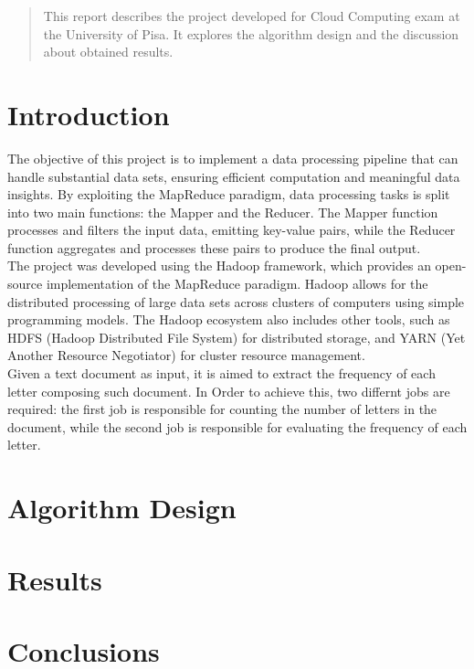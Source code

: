 \documentclass[a4paper, 12pt]{article}
\begin{document}


\tableofcontents
\newpage
\begin{abstract}

  \noindent This report describes the project developed for Cloud Computing exam at the University of Pisa. It explores the algorithm design and the discussion about obtained results.

\end{abstract}


\section{Introduction}

The objective of this project is to implement a data processing pipeline that can handle substantial data sets, ensuring efficient computation and meaningful data insights. By exploiting the MapReduce paradigm, data processing tasks is split into two main functions: the Mapper and the Reducer. The Mapper function processes and filters the input data, emitting key-value pairs, while the Reducer function aggregates and processes these pairs to produce the final output.\\
The project was developed using the Hadoop framework, which provides an open-source implementation of the MapReduce paradigm. Hadoop allows for the distributed processing of large data sets across clusters of computers using simple programming models. The Hadoop ecosystem also includes other tools, such as HDFS (Hadoop Distributed File System) for distributed storage, and YARN (Yet Another Resource Negotiator) for cluster resource management.\\

\noindent Given a text document as input, it is aimed to extract the frequency of each letter composing such document. In Order to achieve this, two differnt jobs are required: the first job is responsible for counting the number of letters in the document, while the second job is responsible for evaluating the frequency of each letter.\\





\section{Algorithm Design}


\section{Results}


\section{Conclusions}
\end{document}
